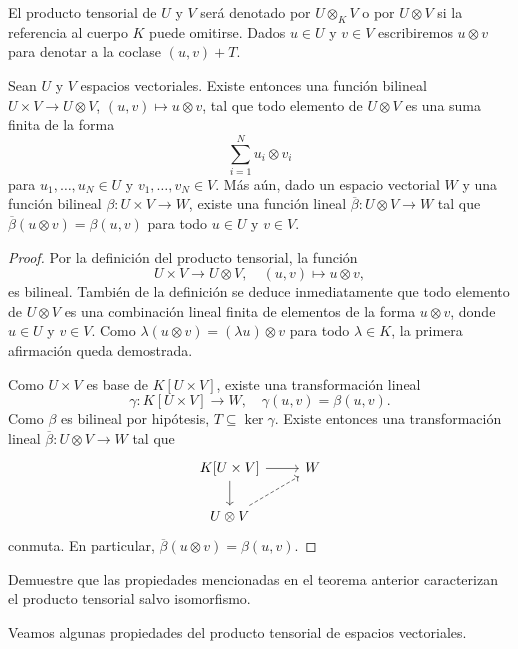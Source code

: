 El producto tensorial de $U$ y $V$ será denotado por $U\otimes_KV$ o por
$U\otimes V$ si la referencia al cuerpo $K$ puede omitirse. Dados $u\in U$
y $v\in V$ escribiremos $u\otimes v$ para denotar a la coclase $(u,v)+T$.

\begin{theorem}
	Sean $U$ y $V$ espacios vectoriales.  Existe entonces una función bilineal
	$U\times V\to U\otimes V$, $(u,v)\mapsto u\otimes v$, tal que todo
	elemento de $U\otimes V$ es una suma finita de la forma
	\[
		\sum_{i=1}^N u_i\otimes v_i
	\]
	para $u_1,\dots,u_N\in U$ y $v_1,\dots,v_N\in V$. 
	Más aún, dado un espacio vectorial $W$ y una función
	bilineal $\beta\colon U\times V\to W$, existe una función lineal
	$\overline{\beta}\colon U\otimes V\to W$ tal que $\overline{\beta}(u\otimes
	v)=\beta(u,v)$ para todo $u\in U$ y $v\in V$.
\end{theorem}

\begin{proof}
	Por la definición del producto tensorial, la función 
	\[
	U\times V\to U\otimes V,\quad
	(u,v)\mapsto u\otimes v,
	\]
	es bilineal. También de la definición se deduce inmediatamente que todo
	elemento de $U\otimes V$ es una combinación lineal finita de elementos de
	la forma $u\otimes v$, donde $u\in U$ y $v\in V$. Como $\lambda(u\otimes
	v)=(\lambda u)\otimes v$ para todo $\lambda\in K$, la primera afirmación
	queda demostrada.

	Como $U\times V$ es base de $K[U\times V]$, existe una transformación lineal 
	\[
		\gamma\colon K[U\times V]\to W,\quad
	\gamma(u,v)=\beta(u,v). 
	\]
	Como $\beta$ es bilineal por hipótesis, $T\subseteq\ker\gamma$. Existe
	entonces una transformación lineal $\overline{\beta}\colon U\otimes V\to
	W$ tal que 
	\[
	\begin{tikzcd}
		K[U\times V] \arrow[r]\arrow[d] & W \\
		U\otimes V\arrow[ur, dashrightarrow]
	\end{tikzcd}
	\]
	conmuta. En particular, $\overline{\beta}(u\otimes v)=\beta(u,v)$. 
\end{proof}

\begin{exercise}
	\label{xca:tensorial_unicidad}
	Demuestre que las propiedades mencionadas en el teorema anterior
	caracterizan el producto tensorial salvo isomorfismo.
\end{exercise}

Veamos algunas propiedades del producto tensorial de espacios vectoriales. 

